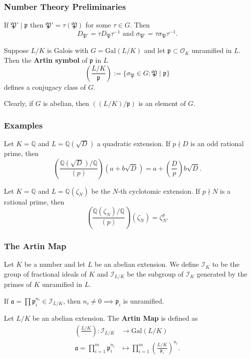 \documentclass{beamer}
\newcommand{\Gal}{\mathrm{Gal}}
\newcommand{\PP}{\mathfrak{P}}
\newcommand{\QQ}{\mathbb{Q}}
\newcommand{\pp}{\mathfrak{p}}
\newcommand{\af}{\mathfrak{a}}
\theoremstyle{plain}
\begin{document}
\begin{frame}
    \frametitle{Number Theory Preliminaries}
    If $\PP'\mid\pp$ then $\PP'=\tau(\PP)$ for some $\tau\in G$. Then 
    $$D_{\PP'}=\tau D_{\PP}\tau^{-1}\text{  and  } \sigma_{\PP'}=\tau\sigma_{\PP}\tau^{-1}.$$
    \pause
    \begin{definition}
        Suppose $L/K$ is Galois with $G=\Gal(L/K)$ and let $\pp\subset\mathcal{O}_K$ unramified in $L$. Then the \textbf{Artin symbol} of $\pp$ in $L$ $$\left(\frac{L/K}{\pp}\right):=\{\sigma_\PP\in G:\PP\mid\pp\}$$ defines a conjugacy class of $G$.
    \end{definition}
    \pause
    Clearly, if $G$ is abelian, then $((L/K)/\pp)$ is an element of $G$.
\end{frame}

\begin{frame}
    \frametitle{Examples}
    \begin{example}
        Let $K=\QQ$ and $L=\QQ(\sqrt{D})$ a quadratic extension. If $p\nmid D$ is an odd rational prime, then
        $$\left(\frac{\QQ(\sqrt{D})/\QQ}{(p)}\right)(a+b\sqrt{D})=a+\left(\frac{D}{p}\right)b\sqrt{D}.$$
    \end{example}
    \pause
    \begin{example}
        Let $K=\QQ$ and $L=\QQ(\zeta_N)$ be the $N$-th cyclotomic extension. If $p\nmid N$ is a rational prime, then
        $$\left(\frac{\QQ(\zeta_N)/\QQ}{(p)}\right)(\zeta_N)=\zeta_N^p.$$
    \end{example}

\end{frame}


\begin{frame}
    \frametitle{The Artin Map}
    \begin{definition}
        Let $K$ be a number and let $L$ be an abelian extension. We define $\mathcal{I}_K$ to be the group of fractional ideals of $K$ and $\mathcal{I}_{L/K}$ be the subgroup of $\mathcal{I}_K$ generated by the primes of $K$ unramified in $L$.
    \end{definition}
    \pause
    If $\af=\prod \pp_i^{n_i}\in\mathcal{I}_{L/K}$, then $n_i\neq 0\implies \pp_i$ is unramified.
    \pause
    \begin{definition}
        Let $L/K$ be an abelian extension. The \textbf{Artin Map} is defined as 
        \begin{align*}
            \left(\frac{L/K}{\cdot}\right):\mathcal{I}_{L/K}&\longrightarrow\Gal(L/K) \\
            \af=\prod_{i=1}^m \pp_i^{n_i}&\longmapsto \prod_{i=1}^m\left(\frac{L/K}{\pp_i}\right)^{n_i}.
        \end{align*}
    \end{definition}
\end{frame}
\end{document}
